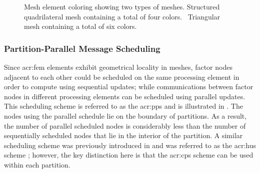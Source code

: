 \begin{figure}
	\caption[Mesh element coloring]{Mesh element coloring showing two types of meshes. \protect{} Structured quadrilateral mesh containing a total of four colors.  \protect{}~Triangular mesh containing a total of six colors.}
	\label{fig:meshCol}
\end{figure}


\subsubsection{Partition-Parallel Message Scheduling}
Since \gls{acr:fem} elements exhibit geometrical locality in meshes, factor nodes adjacent to each other could be scheduled on the same processing element in order to compute using sequential updates; while communications between factor nodes in different processing elements can be scheduled using parallel updates.
This scheduling scheme is referred to as the \gls{acr:pps} and is illustrated in .
The nodes using the parallel schedule lie on the boundary of partitions.
As a result, the number of parallel scheduled nodes is considerably less than the number of sequentially scheduled nodes that lie in the interior of the partition.
A similar scheduling scheme was previously introduced in  and was referred to as the \gls{acr:hus} scheme \cite{bib:El-Kurdi2012EIOGBPSFLSDDLS}; however, the key distinction here is that the \gls{acr:cps} scheme can be used within each partition.


